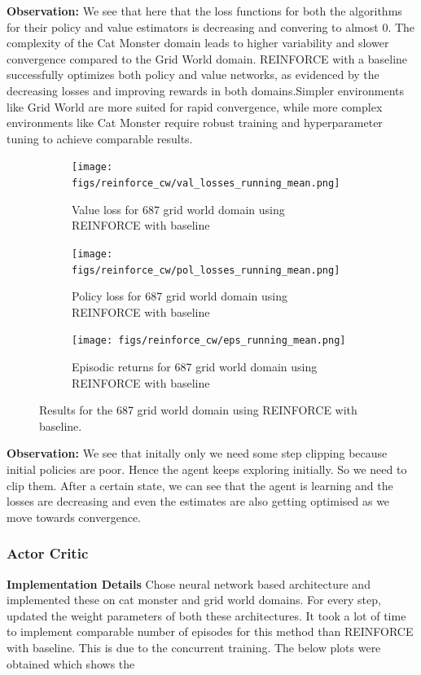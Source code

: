 \documentclass{article}
\begin{document}
\newpage
\textbf{Observation:} We see that here that the loss functions for both the algorithms for their policy and value estimators is decreasing and convering to almost 0. The complexity of the Cat Monster domain leads to higher variability and slower convergence compared to the Grid World domain. REINFORCE with a baseline successfully optimizes both policy and value networks, as evidenced by the decreasing losses and improving rewards in both domains.Simpler environments like Grid World are more suited for rapid convergence, while more complex environments like Cat Monster require robust training and hyperparameter tuning to achieve comparable results.
\begin{figure}[h!]
    \centering
    \begin{subfigure}{0.3\textwidth}
        \texttt{[image: figs/reinforce\_cw/val\_losses\_running\_mean.png]}
        \caption{Value loss for 687 grid world domain using REINFORCE with baseline}
        \label{fig:9}
    \end{subfigure}
    \begin{subfigure}{0.3\textwidth}
        \texttt{[image: figs/reinforce\_cw/pol\_losses\_running\_mean.png]}
        \caption{Policy loss for 687 grid world domain using REINFORCE with baseline}
        \label{fig:8}
    \end{subfigure}
    \begin{subfigure}{0.3\textwidth}
        \texttt{[image: figs/reinforce\_cw/eps\_running\_mean.png]}
        \caption{Episodic returns for 687 grid world domain using REINFORCE with baseline}
        \label{fig:7}
    \end{subfigure}
    \caption{Results for the 687 grid world domain using REINFORCE with baseline.}
    \label{fig:gw_combined}
\end{figure}
\textbf{Observation:} We see that initally only we need some step clipping because initial policies are poor. Hence the agent keeps exploring initially. So we need to clip them. After a certain state, we can see that the agent is learning and the losses are decreasing and even the estimates are also getting optimised as we move towards convergence.

\subsubsection{Actor Critic}
\textbf{Implementation Details}
Chose neural network based architecture and implemented these on cat monster and grid world domains. For every step, updated the weight parameters of both these architectures. It took a lot of time to implement comparable number of episodes for this method than REINFORCE with baseline. This is due to the concurrent training. The below plots were obtained which shows the 
\end{document}

